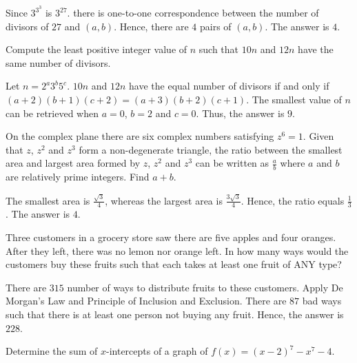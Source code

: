 \begin{solution}
Since $3^{3^3}$ is $3^{27}$. there is one-to-one correspondence between the number of divisors of $27$ and $(a,b)$. Hence, there are $4$ pairs of $(a,b)$. The answer is $4$.
\end{solution}

\begin{problem}
Compute the least positive integer value of $n$ such that $10n$ and $12n$ have the same number of divisors.
\end{problem}

\begin{solution}
Let $n=2^a3^b5^c$. $10n$ and $12n$ have the equal number of divisors if and only if $(a+2)(b+1)(c+2)=(a+3)(b+2)(c+1)$. The smallest value of $n$ can be retrieved when $a=0$, $b=2$ and $c=0$. Thus, the answer is $9$.
\end{solution}

\begin{problem}
On the complex plane there are six complex numbers satisfying $z^6=1$. Given that $z$, $z^2$ and $z^3$ form a non-degenerate triangle, the ratio between the smallest area and largest area formed by $z$, $z^2$ and $z^3$ can be written as $\frac{a}{b}$ where $a$ and $b$ are relatively prime integers. Find $a+b$.
\end{problem}

\begin{solution}
The smallest area is $\frac{\sqrt{3}}{4}$, whereas the largest area is $\frac{3\sqrt{3}}{4}$. Hence, the ratio equals $\frac{1}{3}$. The answer is $4$.
\end{solution}

\begin{problem}
Three customers in a grocery store saw there are five apples and four oranges. After they left, there was no lemon nor orange left. In how many ways would the customers buy these fruits such that each takes at least one fruit of ANY type?
\end{problem}

\begin{solution}
There are $315$ number of ways to distribute fruits to these customers. Apply De Morgan's Law and Principle of Inclusion and Exclusion. There are $87$ bad ways such that there is at least one person not buying any fruit. Hence, the answer is $228$.
\end{solution}

\begin{problem}
Determine the sum of $x$-intercepts of a graph of $f(x)=(x-2)^7-x^7-4$.
\end{problem}


